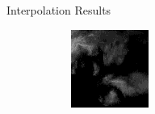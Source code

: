 \documentclass{beamer}
\begin{document}
\begin{frame}{Interpolation Results}
\begin{figure}
\begin{subfigure}{.3\textwidth}
\begin{mdframed}[style=red,nobreak=true,align=center]
	        \end{mdframed}
	    \end{subfigure}
	    \begin{subfigure}{.3\textwidth}
	        \centering
	        \begin{mdframed}[style=blue,nobreak=true,align=center]
	        \includegraphics[width=\linewidth]{fig/inter/3.png}
	        \end{mdframed}
	    \end{subfigure}
	\end{figure}


\end{frame}
\end{document}
